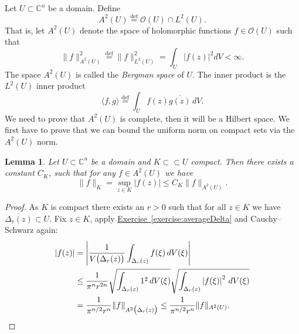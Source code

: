 \documentclass[12pt,openany]{book}
\newcommand{\linnprod}[2]{\langle #1 , #2 \rangle}
\newcommand{\sabs}[1]{\lvert {#1} \rvert}
\newcommand{\snorm}[1]{\lVert {#1} \rVert}
\newcommand{\abs}[1]{\left\lvert {#1} \right\rvert}
\newcommand{\C}{{\mathbb{C}}}
\newcommand{\sO}{{\mathcal{O}}}
\newcommand{\myindex}[1]{#1\index{#1}}
\theoremstyle{plain}
\newtheorem{lemma}[thm]{Lemma}
\theoremstyle{remark}
\theoremstyle{definition}
\theoremstyle{exercise}
\theoremstyle{example}
\newcommand{\exerciseref}[1]{\hyperref[#1]{Exercise~\ref*{#1}}}
\begin{document}
Let $U \subset \C^n$ be a domain.  Define
\begin{equation*}
A^2(U) \overset{\text{def}}{=} \sO(U) \cap L^2(U) .
\end{equation*}
That is, let $A^2(U)$ denote the space
of holomorphic functions $f \in \sO(U)$ such that
\begin{equation*}
\snorm{f}_{A^2(U)}^2 \overset{\text{def}}{=} \snorm{f}_{L^2(U)}^2
= \int_U \sabs{f(z)}^2 dV < \infty .
\end{equation*}
The space $A^2(U)$ is called the
\emph{\myindex{Bergman space}} of $U$.
The inner product is the $L^2(U)$ inner product
\begin{equation*}
\linnprod{f}{g} \overset{\text{def}}{=} \int_U f(z) \overline{g(z)} \, dV .
\end{equation*}
We need to prove that $A^2(U)$ is
complete, then it will be a Hilbert space.  We first
have to prove that we can bound
the uniform norm on compact sets via the $A^2(U)$ norm.

\begin{lemma} \label{lemma:bergmanKbound}
Let $U \subset \C^n$ be a domain and $K \subset \subset U$ compact.  Then
there exists a constant $C_K$, such that for any $f\in A^2(U)$ we have
\begin{equation*}
\snorm{f}_K
=
\sup_{z \in K} \sabs{f(z)} 
\leq C_K \snorm{f}_{A^2(U)} .
\end{equation*}
\end{lemma}

\begin{proof}
As $K$ is compact there exists an $r > 0$ such that for all $z \in K$
we have $\overline{\Delta_r(z)} \subset U$.  Fix $z \in K$,
apply \exerciseref{exercise:averageDelta} and Cauchy--Schwarz again:
\begin{equation*}
\begin{split}
\abs{f(z)} &=
\abs{\frac{1}{V\bigl(\Delta_r(z)\bigr)} \int_{\Delta_r(z)} f(\xi) \,
dV(\xi)}
\\
& \leq
\frac{1}{\pi^n r^{2n}}
\sqrt{\int_{\Delta_r(z)} 1^2 \, dV(\xi)}
\sqrt{\int_{\Delta_r(z)} \abs{f(\xi)}^2 \, dV(\xi)}
\\
& =
\frac{1}{\pi^{n/2} r^n}
\snorm{f}_{A^2\bigl(\Delta_r(z)\bigr)} 
\leq
\frac{1}{\pi^{n/2} r^n}
\snorm{f}_{A^2(U)} . \qedhere
\end{split}
\end{equation*}
\end{proof}
\end{document}
